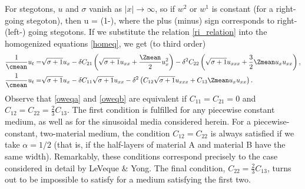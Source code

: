For stegotons, $u$ and $\sigma$ vanish as $|x|\to\infty$, so if
$w^2$ or $w^1$ is constant (for a right-going stegoton), then 
\be \label{ri_relation}
u = \pm {}(1-),
\ee
where the plus (minus) sign corresponds to right- (left-) going stegotons.
If we substitute the relation \eqref{ri_relation} 
into the homogenized equations \eqref{homeq}, we get (to third order)
\begin{subequations} \label{oweq}
\begin{align} \label{oweqa}
\frac{1}{\cmean}u_t = & \sqrt{\sigma+1} u_x
   - \delta C_{21}\left(\sqrt{\sigma+1}u_{xx}+\frac{\Zmean}{2}u_x^2\right)
   - \delta^2 C_{22}\left(\sqrt{\sigma+1}u_{xxx}+\frac{3}{2}\Zmean u_x u_{xx}\right), \\
\frac{1}{\cmean}u_t = & \sqrt{\sigma+1} u_x 
   - \delta C_{11} \sqrt{\sigma+1}u_{xx}
   - \delta^2\left(C_{12}\sqrt{\sigma+1}u_{xxx}+C_{13}\Zmean u_x u_{xx}\right).
\label{oweqb}
\end{align}
\end{subequations}
Observe that \eqref{oweqa} and \eqref{oweqb} are equivalent if 
$C_{11}=C_{21}=0$
and $C_{12}=C_{22}=\frac{2}{3}C_{13}$.  The first condition is fulfilled
for any piecewise constant medium, as well as for the sinusoidal media
considered herein.  For a piecewise-constant, two-material medium, the 
condition $C_{12}=C_{22}$ is always satisfied if we take $\alpha=1/2$
(that is, if the half-layers of material A and material B have the same 
width).  Remarkably, these conditions correspond precisely to the case
considered in detail by LeVeque \& Yong.  The final condition,
$C_{22}=\frac{2}{3}C_{13}$, turns out to be impossible to satisfy
for a medium satisfying the first two.

